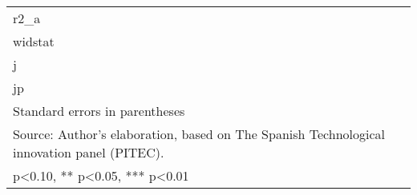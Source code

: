 \begin{table}[htbp]
\begin{tabular}{l*{9}{c}}
r2\_a                &               &               &               &               &               &               &               &               &               \\
widstat             &               &               &               &               &               &               &               &               &               \\
j                   &               &               &               &               &               &               &               &               &               \\
jp                  &               &               &               &               &               &               &               &               &               \\
\hline\hline
\multicolumn{10}{l}{\footnotesize Standard errors in parentheses}\\
\multicolumn{10}{l}{\footnotesize Source: Author's elaboration, based on The Spanish Technological innovation panel (PITEC).}\\
\multicolumn{10}{l}{\footnotesize * p<0.10, ** p<0.05, *** p<0.01}\\
\end{tabular}
\end{table}
